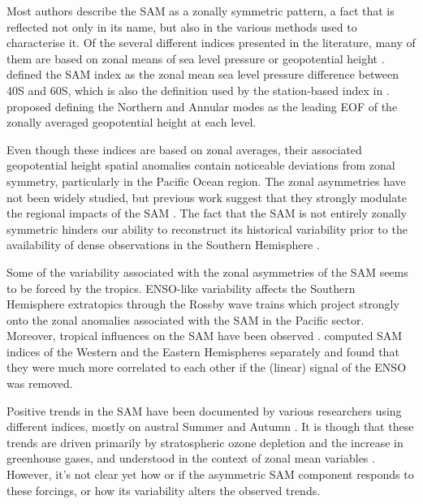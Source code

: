 \documentclass[smallextended]{svjour3}       %
\begin{document}
Most authors describe the SAM as a zonally symmetric pattern, a fact that is reflected not only in its name, but also in the various methods used to characterise it. Of the several different indices presented in the literature, many of them are based on zonal means of sea level pressure or geopotential height \citep{ho2012}. \citet{gong1999} defined the SAM index as the zonal mean sea level pressure difference between 40\degree S and 60\degree S, which is also the definition used by the station-based index in \citet{marshall2003}. \citet{baldwin2009} proposed defining the Northern and Annular modes as the leading EOF of the zonally averaged geopotential height at each level.

Even though these indices are based on zonal averages, their associated geopotential height spatial anomalies contain noticeable deviations from zonal symmetry, particularly in the Pacific Ocean region. The zonal asymmetries have not been widely studied, but previous work suggest that they strongly modulate the regional impacts of the SAM \citep{fan2007, silvestri2009, fogt2012, rosso2018}. The fact that the SAM is not entirely zonally symmetric hinders our ability to reconstruct its historical variability prior to the availability of dense observations in the Southern Hemisphere \citep{jones2009}.

Some of the variability associated with the zonal asymmetries of the SAM seems to be forced by the tropics. ENSO-like variability affects the Southern Hemisphere extratopics through the Rossby wave trains \citep{mo1987, kidson1988, karoly1989} which project strongly onto the zonal anomalies associated with the SAM in the Pacific sector. Moreover, tropical influences on the SAM have been observed \citep{fan2007, fogt2011, clem2013}. \citet{fan2007} computed SAM indices of the Western and the Eastern Hemispheres separately and found that they were much more correlated to each other if the (linear) signal of the ENSO was removed.

Positive trends in the SAM have been documented by various researchers using different indices, mostly on austral Summer and Autumn \citep[e.g.][ and references therein]{fogt2020}. It is though that these trends are driven primarily by stratospheric ozone depletion and the increase in greenhouse gases, and understood in the context of zonal mean variables \citep{marshall2004, gillett2005, arblaster2006, gillett2013}. However, it's not clear yet how or if the asymmetric SAM component responds to these forcings, or how its variability alters the observed trends.
\end{document}
